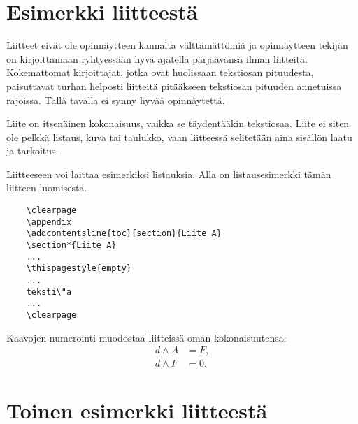 \documentclass[english, 12pt, a4paper, elec, utf8, a-1b, online]{aaltothesis}
\begin{document}
\clearpage

\thesisbibliography




\clearpage

\thesisappendix

\section{Esimerkki liitteest\"a\label{LiiteA}}

Liitteet eiv\"at ole opinn\"aytteen kannalta v\"altt\"am\"att\"omi\"a ja 
opinn\"aytteen tekij\"an on 
kirjoittamaan ryhtyess\"a\"an hyv\"a ajatella p\"arj\"a\"av\"ans\"a ilman liitteit\"a.
Kokemattomat kirjoittajat, jotka ovat huolissaan
tekstiosan pituudesta, paisuttavat turhan 
helposti liitteit\"a pit\"a\"akseen tekstiosan pituuden annetuissa rajoissa.
T\"all\"a tavalla ei synny hyv\"a\"a opinn\"aytett\"a.   

Liite on itsen\"ainen kokonaisuus, vaikka se t\"aydent\"a\"akin tekstiosaa.
Liite ei siten ole pelkk\"a listaus, kuva tai taulukko, vaan 
liitteess\"a selitet\"a\"an aina sis\"all\"on laatu ja tarkoitus. 

Liitteeseen voi laittaa esimerkiksi listauksia. Alla on 
listausesimerkki t\"am\"an liitteen luomisesta. 

\begin{verbatim}
	\clearpage
	\appendix
	\addcontentsline{toc}{section}{Liite A}
	\section*{Liite A}
	...
	\thispagestyle{empty}
	...
	teksti\"a
	...
	\clearpage
\end{verbatim}

Kaavojen numerointi muodostaa liitteiss\"a oman kokonaisuutensa:
\begin{align}
d \wedge A &= F, \label{liitekaava1}\\
d \wedge F &= 0. \label{liitekaava2}
\end{align}


\clearpage
\section{Toinen esimerkki liitteest\"a\label{LiiteB}}
\end{document}

